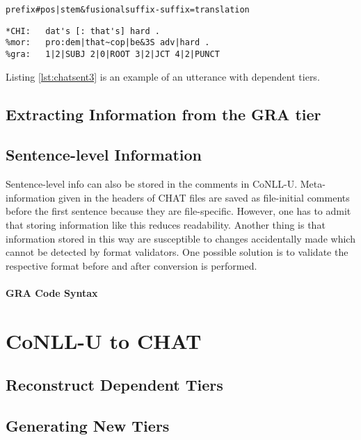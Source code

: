
\texttt{prefix\#pos|stem\&fusionalsuffix-suffix=translation}

\lstset{
numbers = none,
frame = single,
}

\begin{lstlisting}[caption={Excerpt from Adam/040217.cha of the Brown Corpus (\cite{brown1973})}, label={lst:chatsent3}]
*CHI:   dat's [: that's] hard .
%mor:   pro:dem|that~cop|be&3S adv|hard .
%gra:   1|2|SUBJ 2|0|ROOT 3|2|JCT 4|2|PUNCT
\end{lstlisting}

Listing \ref{lst:chatsent3} is an example of an utterance with dependent tiers.\\

\subsection{Extracting Information from the GRA tier}

\subsection{Sentence-level Information}
Sentence-level info can also be stored in the comments in CoNLL-U. Meta-information given in the headers of CHAT files are saved as file-initial comments before the first sentence because they are file-specific.
However, one has to admit that storing information like this reduces readability. Another thing is that information stored in this way are susceptible to changes accidentally made which cannot be detected by format validators. One possible solution is to validate the respective format before and after conversion is performed.


\paragraph{GRA Code Syntax}

\section{CoNLL-U to CHAT}

\subsection{Reconstruct Dependent Tiers}

\subsection{Generating New Tiers}
